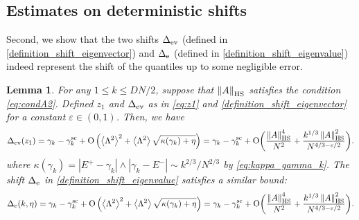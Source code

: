 \documentclass[10pt,reqno]{amsart}
\numberwithin{equation}{section}
\numberwithin{figure}{section}
\theoremstyle{plain} %
\newtheorem{lemma}[theorem]{Lemma}
\theoremstyle{definition} %
\renewcommand{\txt}[1]{\text{\rm{#1}}}
\renewcommand{\leq}{\le}
\newcommand{\pa}[1]{\left({#1}\right)}
\newcommand{\norma}[1]{\left\lVert #1 \right\rVert}
\newcommand{\avga}[1]{\left\langle #1 \right\rangle}
\newcommand{\OO}{\mathrm{O}}
\newcommand{\HS}{\txt{HS}}
\numberwithin{equation}{section}
\begin{document}
\subsection{Estimates on deterministic shifts}
Second, we show that the two shifts $\Delta_{\txt{ev}}$ (defined in \eqref{definition_shift_eigenvector}) and $\Delta_{\txt{e}}$ (defined in \eqref{definition_shift_eigenvalue}) indeed represent the shift of the quantiles up to some negligible error. 

\begin{lemma}%
\label{lemma_modification_of_shift}
For any $1\le k\leq DN/2$, suppose that $\norma{A}_{\txt{HS}}$ satisfies the condition \eqref{eq:condA2}. Defined $z_1$ and $\Delta_{\txt{ev}}$ as in \eqref{eq:z1} and \eqref{definition_shift_eigenvector} for a constant $\varepsilon\in\pa{0,1}$.
Then, we have 
\begin{equation}\label{modification_shift_eigenvector}
            \begin{aligned}
                \Delta_{\txt{ev}}(z_1)=\gamma_k-\gamma_{k}^{\txt{sc}}+\OO\pa{\avga{\Lambda^2}^2+\avga{\Lambda^2}\sqrt{\kappa(\gamma_k)+\eta}}=\gamma_k-\gamma_{k}^{\txt{sc}}+\OO\bigg(\frac{\norma{A}_{\HS}^4}{N^{2}}+\frac{k^{ 1/ 3}\norma{A}_{\HS}^2}{N^{4/ 3-{\varepsilon}/{2}}}\bigg).
            \end{aligned}
        \end{equation}
where $\kappa(\gamma_k)=|E^+-\gamma_k|\wedge|\gamma_k-E^-|\sim {k^{2/3}}/{N^{2/3}}$ by \eqref{eq:kappa_gamma_k}.
The shift $\Delta_{\txt{e}}$ in \eqref{definition_shift_eigenvalue} satisfies a similar bound:         \begin{equation}\label{modification_shift_eigenvalue}
\begin{aligned}
\Delta_{\txt{e}}(k,\eta)=\gamma_k-\gamma_{k}^{\txt{sc}}+\OO\pa{\avga{\Lambda^2}^2+\avga{\Lambda^2}\sqrt{\kappa(\gamma_k)+\eta}}=\gamma_k-\gamma_{k}^{\txt{sc}}+\OO\bigg(\frac{\norma{A}_{\HS}^4}{N^{2}}+\frac{k^{ 1/ 3}\norma{A}_{\HS}^2}{N^{4/ 3-{\varepsilon}/{2}}}\bigg). %
\end{aligned}
\end{equation}

\end{lemma}
\end{document}
